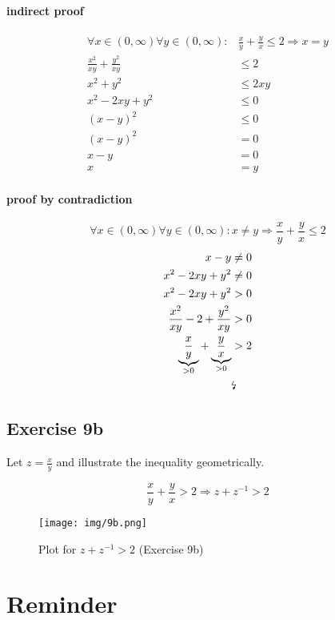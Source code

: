 \documentclass[a4paper]{article}
\theoremstyle{definition}
\begin{document}
\paragraph{indirect proof}
\begin{align*}
  \forall x \in (0, \infty) \forall y \in (0, \infty): &\frac xy + \frac yx \leq 2 \Rightarrow x = y \\
   \frac{x^2}{xy} + \frac{y^2}{xy} &\leq 2 \\
   x^2 + y^2 &\leq 2xy \\
   x^2 - 2xy + y^2 &\leq 0 \\
   (x - y)^2 &\leq 0 \\
   (x - y)^2 &= 0 \\
   x - y &= 0 \\
   x &= y
\end{align*}

\paragraph{proof by contradiction}
\[ \forall x \in (0, \infty) \forall y \in (0, \infty): x \neq y \Rightarrow \frac xy + \frac yx \leq 2 \]
\begin{align*}
  x - y &\neq 0 \\
  x^2 - 2xy + y^2 &\neq 0 \\
  x^2 - 2xy + y^2 &> 0 \\
  \frac{x^2}{xy} - 2 + \frac{y^2}{xy} &> 0 \\
  \underbrace{\frac{x}{y}}_{>0} + \underbrace{\frac{y}{x}}_{>0} &> 2 \\
    &\text{\lightning}
\end{align*}

\subsection{Exercise 9b}
%
Let $z = \frac{x}{y}$ and illustrate the inequality geometrically.

\[ \frac{x}{y} + \frac{y}{x} > 2 \Rightarrow z + z^{-1} > 2 \]

\begin{figure}[!ht]
  \begin{center}
    \texttt{[image: img/9b.png]}
    \caption{Plot for $z + z^{-1} > 2$ (Exercise 9b)}
  \end{center}
\end{figure}

\section{Reminder}
\end{document}
